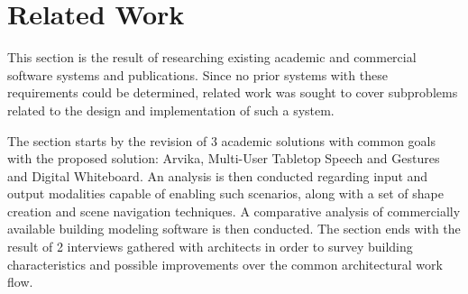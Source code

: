 \chapter{Related Work}

This section is the result of researching existing academic and commercial software systems and publications.
Since no prior systems with these requirements could be determined, related work was sought to cover subproblems
related to the design and implementation of such a system.

The section starts by the revision of 3 academic solutions with common goals with the proposed solution:
Arvika, Multi-User Tabletop Speech and Gestures and Digital Whiteboard.
An analysis is then conducted regarding input and output modalities capable of enabling such scenarios,
along with a set of shape creation and scene navigation techniques.
A comparative analysis of commercially available building modeling software is then conducted.
The section ends with the result of 2 interviews gathered with architects in order to survey
building characteristics and possible improvements over the common architectural work flow.






